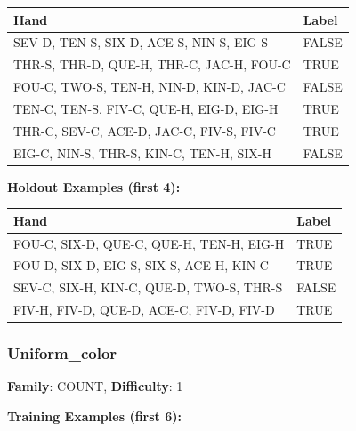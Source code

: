 \documentclass[10pt,a4paper]{article}
\begin{document}
\begin{small}
\begin{tabular}{p{8cm}l}
\toprule
Hand & Label \\
\midrule
SEV-D, TEN-S, SIX-D, ACE-S, NIN-S, EIG-S & \textcolor{negative}{FALSE} \\
THR-S, THR-D, QUE-H, THR-C, JAC-H, FOU-C & \textcolor{positive}{TRUE} \\
FOU-C, TWO-S, TEN-H, NIN-D, KIN-D, JAC-C & \textcolor{negative}{FALSE} \\
TEN-C, TEN-S, FIV-C, QUE-H, EIG-D, EIG-H & \textcolor{positive}{TRUE} \\
THR-C, SEV-C, ACE-D, JAC-C, FIV-S, FIV-C & \textcolor{positive}{TRUE} \\
EIG-C, NIN-S, THR-S, KIN-C, TEN-H, SIX-H & \textcolor{negative}{FALSE} \\
\bottomrule
\end{tabular}
\end{small}

\textbf{Holdout Examples (first 4):}

\begin{small}
\begin{tabular}{p{8cm}l}
\toprule
Hand & Label \\
\midrule
FOU-C, SIX-D, QUE-C, QUE-H, TEN-H, EIG-H & \textcolor{positive}{TRUE} \\
FOU-D, SIX-D, EIG-S, SIX-S, ACE-H, KIN-C & \textcolor{positive}{TRUE} \\
SEV-C, SIX-H, KIN-C, QUE-D, TWO-S, THR-S & \textcolor{negative}{FALSE} \\
FIV-H, FIV-D, QUE-D, ACE-C, FIV-D, FIV-D & \textcolor{positive}{TRUE} \\
\bottomrule
\end{tabular}
\end{small}

\vspace{0.5cm}

\subsubsection{Uniform\_color}

\textbf{Family}: COUNT, \textbf{Difficulty}: 1

\textbf{Training Examples (first 6):}
\end{document}
